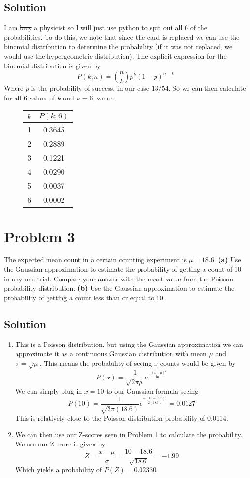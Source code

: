 \documentclass[]{article}
\newcommand{\bd}{\textbf}
\begin{document}
		\subsection*{Solution}
		I am \sout{lazy} a physicist so I will just use python to spit out all 6 of the probabilities. To do this, we note that since the card is replaced we can use the binomial distribution to determine the probability (if it was not replaced, we would use the hypergeometric distribution). The explicit expression for the binomial distribution is given by
		\[
			P(k;n) = {n \choose k}p^{k}(1-p)^{n-k}
		\]
		Where $p$ is the probability of success, in our case $13/54$. So we can then calculate for all 6 values of $k$ and $n = 6$, we see
		\begin{figure}[h]
			\centering
			\begin{tabular}{|c|c|}
				\hline
				$k$& $P(k; 6)$\\
				\hline
				1& 0.3645\\
				2& 0.2889\\
				3& 0.1221\\
				4& 0.0290\\
				5& 0.0037\\
				6& 0.0002\\
				\hline
			\end{tabular}
		\end{figure}
	\section*{Problem 3} %
		The expected mean count in a certain counting experiment is $\mu = 18.6$. \bd{(a)} Use the	Gaussian approximation to estimate the probability of getting a count of 10 in any one trial. Compare your answer with the exact value from the Poisson probability distribution. \bd{(b)} Use the Gaussian approximation to estimate the probability of getting a count less than or equal to 10.
		\subsection*{Solution}
			\begin{enumerate}[label = \bd{(\alph*)}]
				\item This is a Poisson distribution, but using the Gaussian approximation we can approximate it as a continuous Gaussian distribution with mean $\mu$ and $\sigma = \sqrt \mu$. This means the probability of seeing $x$ counts would be given by
				\[
					P(x) = \frac{1}{\sqrt{2\pi\mu}}e^{\frac{-(x-\mu)^2}{2\mu}} 
				\]
				We can simply plug in $x = 10$ to our Gaussian formula seeing
				\[
					P(10) = \frac{1}{\sqrt{2\pi(18.6)}}e^{\frac{-(10-18.6)^2}{2(18.6)}} = \boxed{0.0127}
				\]
				This is relatively close to the Poisson distribution probability of 0.0114.
				\item We can then use our Z-scores seen in Problem 1 to calculate the probability. We see our Z-score is given by
				\[
					Z= \frac{x - \mu}{\sigma} = \frac{10 - 18.6}{\sqrt{18.6}} = -1.99
				\]
				Which yields a probability of $P(Z) = \boxed{0.02330}$.
			\end{enumerate}
\end{document}
